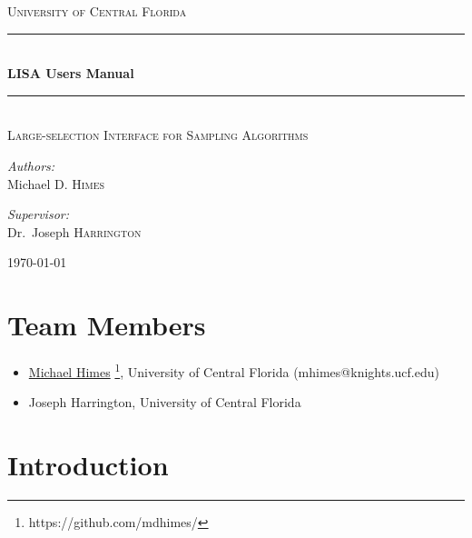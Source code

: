 \documentclass[letterpaper, 12pt]{article}
\begin{document}
\begin{titlepage}
\begin{center}

\textsc{\LARGE University of Central Florida}\\[1.5cm]

\rule{\linewidth}{0.5mm} \\[0.4cm]
{ \huge \bfseries LISA Users Manual \\[0.4cm] }
\rule{\linewidth}{0.5mm} \\[1.0cm]

\textsc{\Large Large-selection Interface for Sampling Algorithms}\\[1.5cm]

\noindent
\begin{minipage}{0.4\textwidth}
\begin{flushleft}
\large
\emph{Authors:} \\
Michael D. \textsc{Himes} \\
\end{flushleft}
\end{minipage}%
\begin{minipage}{0.4\textwidth}
\begin{flushright} \large
\emph{Supervisor:} \\
Dr.~Joseph \textsc{Harrington}
\end{flushright}
\end{minipage}
\vfill

{\large \today}

\end{center}
\end{titlepage}

\tableofcontents
\newpage

\section{Team Members}
\label{sec:team}

\begin{itemize}
\item \href{https://github.com/mdhimes/}{Michael Himes}%
  \footnote{https://github.com/mdhimes/}, University of
  Central Florida (mhimes@knights.ucf.edu)
\item Joseph Harrington, University of Central Florida
\end{itemize}

\section{Introduction}
\label{sec:theory}
\end{document}
